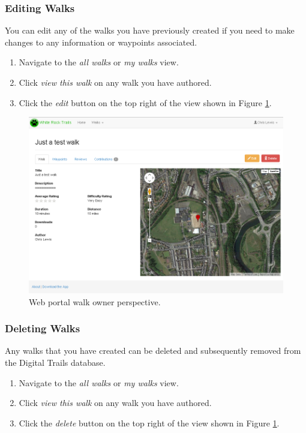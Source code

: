 \documentclass[11pt,a4paper]{report}
\begin{document}
\subsubsection{Editing Walks}

You can edit any of the walks you have previously created if you need to make changes to any information or waypoints associated.

\begin{enumerate}
\item Navigate to the \emph{all walks} or \emph{my walks} view.
\item Click \emph{view this walk} on any walk you have authored.
\item Click the \emph{edit} button on the top right of the view shown in Figure \ref{fig:walk-info-guide}.
\end{enumerate}

\begin{figure}[H]
\centering
\includegraphics[width=0.8\linewidth]{./img/webportal/walk-info}
\caption{Web portal walk owner perspective.}
\label{fig:walk-info-guide}
\end{figure}

\subsubsection{Deleting Walks}

Any walks that you have created can be deleted and subsequently removed from the Digital Trails database.

\begin{enumerate}
\item Navigate to the \emph{all walks} or \emph{my walks} view.
\item Click \emph{view this walk} on any walk you have authored.
\item Click the \emph{delete} button on the top right of the view shown in Figure \ref{fig:walk-info-guide}.
\end{enumerate}
\end{document}
